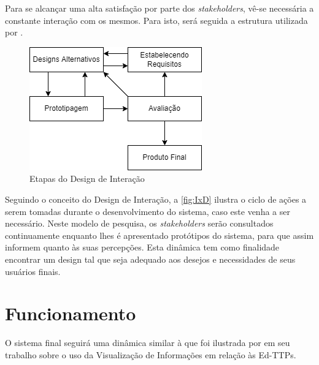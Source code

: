 Para se alcançar uma alta satisfação por parte dos \textit{stakeholders}, vê-se necessária a constante interação com os mesmos. Para isto, será seguida a estrutura utilizada por \cite{andre_interaction_2018}.

\begin{figure}[htbp]\centering
  \caption{Etapas do Design de Interação}
  \label{fig:IxD}
  \includegraphics{files/img/Arquitetura/Arquitetura-IxD}
  \legend{\selfAuthor}
\end{figure}    %

Seguindo o conceito do Design de Interação, a \autoref{fig:IxD} ilustra o ciclo de ações a serem tomadas durante o desenvolvimento do sistema, caso este venha a ser necessário. Neste modelo de pesquisa, os \textit{stakeholders} serão consultados continuamente enquanto lhes é apresentado protótipos do sistema, para que assim informem quanto às suas percepções. Esta dinâmica tem como finalidade encontrar um design tal que seja adequado aos desejos e necessidades de seus usuários finais.

\section{Funcionamento}

O sistema final seguirá uma dinâmica similar à que foi ilustrada por \cite{bebis_information_2019} em seu trabalho sobre o uso da Visualização de Informações em relação às Ed-TTPs.

